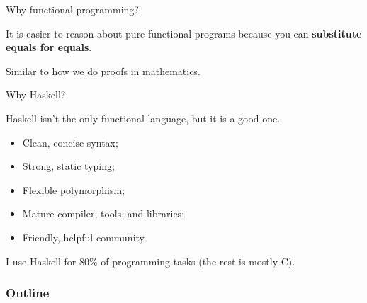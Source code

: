 %
\begin{frame}[fragile]{Why functional programming?}

It is easier to reason about pure functional programs because you can
\textbf{substitute equals for equals}.

Similar to how we do proofs in mathematics.

\end{frame}

%
\begin{frame}{Why Haskell?}

Haskell isn't the only functional language, but it is a good one.

\begin{itemize}
  \item Clean, concise syntax;
  \item Strong, static typing;
  \item Flexible polymorphism;
  \item Mature compiler, tools, and libraries;
  \item Friendly, helpful community.
\end{itemize}

I use Haskell for 80\% of programming tasks (the rest is mostly C).

\end{frame}

\begin{frame}
  \frametitle{Outline}
  \tableofcontents
\end{frame}
